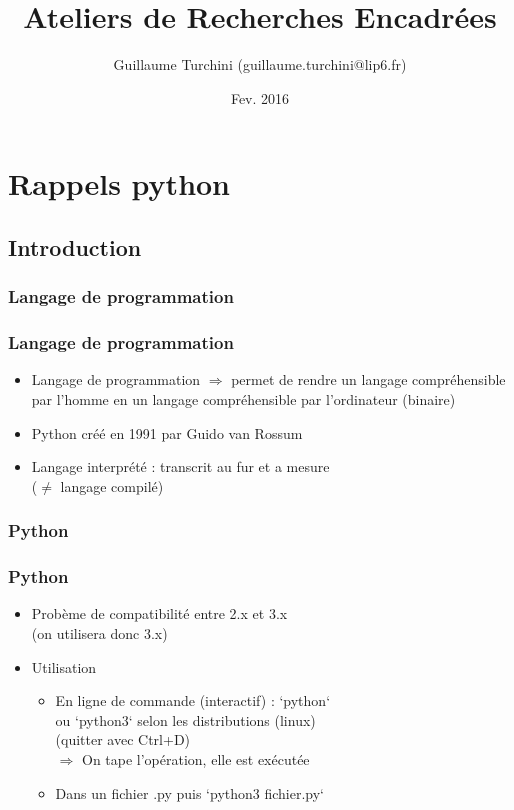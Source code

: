 \documentclass{beamer}
\title[Cours ARE]{Ateliers de Recherches Encadrées}
\author[Guillaume Turchini]{Guillaume Turchini (guillaume.turchini@lip6.fr)}
\institute{SmartGrid}
\date{Fev. 2016}
\let\oldsubsubsection\subsubsection
\renewcommand{\subsubsection}[2][]{\def\currentsubsubsection{#2}\oldsubsubsection[#1]{#2}}
\begin{document}
\begin{frame}
  \titlepage
\end{frame}

\begin{frame}
  \setcounter{tocdepth}{2}
  \tableofcontents
  \setcounter{tocdepth}{4}
\end{frame}

\let\oldframe\frame
\let\endoldframe\endframe
\renewenvironment{frame}{\oldframe\frametitle{\currentsubsubsection}}{\endoldframe}

\section{Rappels python}
\subsection{Introduction}

\subsubsection{Langage de programmation}

\begin{frame}
  \begin{itemize}
    \item Langage de programmation $\Rightarrow$ permet de rendre un langage compréhensible par l'homme en un langage compréhensible par l'ordinateur (binaire)
    \item Python créé en 1991 par Guido van Rossum
    \item Langage interprété : transcrit au fur et a mesure\\($\neq$ langage compilé)
  \end{itemize}
\end{frame}

\subsubsection{Python}

\begin{frame}
    \begin{itemize}
        \item Probème de compatibilité entre 2.x et 3.x\\(on utilisera donc 3.x)
      
        \item Utilisation
        \begin{itemize}
            \item En ligne de commande (interactif) : `python`\\
            \quad ou `python3` selon les distributions (linux)\\
            \quad (quitter avec Ctrl+D)\\
            \qquad $\Rightarrow$ On tape l'opération, elle est exécutée
          
            \item Dans un fichier .py puis `python3 fichier.py`
        \end{itemize}
    \end{itemize}
\end{frame}
\end{document}
